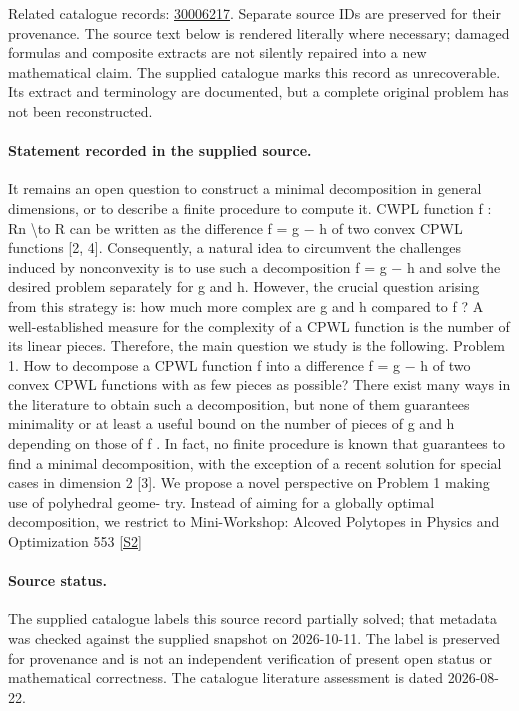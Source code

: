\documentclass[11pt]{article}
\begin{document}
Related catalogue records: \href{https://mehmetmars7.github.io/Erdosproblems-llm-hunter/problem.html?type=open_problems&id=30006217}{30006217}. Separate source IDs are preserved for their provenance.
The source text below is rendered literally where necessary; damaged formulas and composite extracts are not silently repaired into a new mathematical claim.
The supplied catalogue marks this record as unrecoverable. Its extract and terminology are documented, but a complete original problem has not been reconstructed.
\paragraph{Statement recorded in the supplied source.}
It remains an open question to construct a minimal decomposition in general dimensions, or to describe a finite procedure to compute it. CWPL function f : Rn \textbackslash{}to R can be written as the difference f = g − h of two convex CPWL functions [2, 4]. Consequently, a natural idea to circumvent the challenges induced by nonconvexity is to use such a decomposition f = g − h and solve the desired problem separately for g and h. However, the crucial question arising from this strategy is: how much more complex are g and h compared to f ? A well-established measure for the complexity of a CPWL function is the number of its linear pieces. Therefore, the main question we study is the following. Problem 1. How to decompose a CPWL function f into a difference f = g − h of two convex CPWL functions with as few pieces as possible? There exist many ways in the literature to obtain such a decomposition, but none of them guarantees minimality or at least a useful bound on the number of pieces of g and h depending on those of f . In fact, no finite procedure is known that guarantees to find a minimal decomposition, with the exception of a recent solution for special cases in dimension 2 [3]. We propose a novel perspective on Problem 1 making use of polyhedral geome- try. Instead of aiming for a globally optimal decomposition, we restrict to Mini-Workshop: Alcoved Polytopes in Physics and Optimization 553 \href{https://doi.org/10.4171/owr/2025/12}{[S2]}
\paragraph{Source status.}
The supplied catalogue labels this source record partially solved; that metadata was checked against the supplied snapshot on 2026-10-11. The label is preserved for provenance and is not an independent verification of present open status or mathematical correctness. The catalogue literature assessment is dated 2026-08-22.
\end{document}

